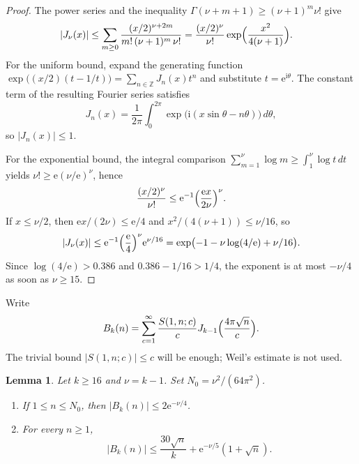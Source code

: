 \documentclass[11pt]{amsart}
\newtheorem{lemma}[theorem]{Lemma}
\theoremstyle{definition}
\theoremstyle{remark}
\numberwithin{equation}{section}
\newcommand{\ZZ}{\mathbb{Z}}
\newcommand{\ee}{\mathrm{e}}
\newcommand{\ii}{\mathrm{i}}
\begin{document}
\begin{proof}
The power series and the inequality $\Gamma(\nu+m+1)\ge(\nu+1)^m\nu!$ give
\begin{align*}
\lvert J_\nu(x)\rvert
&\le\sum_{m\ge 0}\frac{(x/2)^{\nu+2m}}{m!\,(\nu+1)^m\,\nu!}
=\frac{(x/2)^\nu}{\nu!}\exp\Bigl(\frac{x^2}{4(\nu+1)}\Bigr).
\end{align*}
For the uniform bound, expand the generating function $\exp\bigl((x/2)(t-1/t)\bigr)=\sum_{n\in\ZZ}J_n(x)t^n$ and substitute $t=\ee^{\ii\theta}$. The constant term of the resulting Fourier series satisfies
\[
J_n(x)=\frac{1}{2\pi}\int_0^{2\pi}\exp\bigl(\ii(x\sin\theta-n\theta)\bigr)\,d\theta,
\]
so $\lvert J_n(x)\rvert\le 1$.

For the exponential bound, the integral comparison $\sum_{m=1}^\nu\log m\ge\int_1^\nu\log t\,dt$ yields $\nu!\ge\ee(\nu/\ee)^\nu$, hence
\[
\frac{(x/2)^\nu}{\nu!}
\le\ee^{-1}\Bigl(\frac{\ee x}{2\nu}\Bigr)^\nu.
\]
If $x\le\nu/2$, then $\ee x/(2\nu)\le\ee/4$ and $x^2/(4(\nu+1))\le\nu/16$, so
\[
\lvert J_\nu(x)\rvert
\le\ee^{-1}\Bigl(\frac{\ee}{4}\Bigr)^\nu\ee^{\nu/16}
=\exp\bigl(-1-\nu\log(4/\ee)+\nu/16\bigr).
\]
Since $\log(4/\ee)>0.386$ and $0.386-1/16>1/4$, the exponent is at most $-\nu/4$ as soon as $\nu\ge 15$.
\end{proof}

Write
\begin{equation}\label{eq:Bk-def}
B_k(n)
=\sum_{c=1}^\infty\frac{S(1,n;c)}{c}
J_{k-1}\Bigl(\frac{4\pi\sqrt n}{c}\Bigr).
\end{equation}
The trivial bound $\lvert S(1,n;c)\rvert\le c$ will be enough; Weil's estimate is not used.

\begin{lemma}\label{lem:Bk-small}
Let $k\ge 16$ and $\nu=k-1$. Set $N_0=\nu^2/(64\pi^2)$.
\begin{enumerate}[label=\rm(\roman*)]
\item If $1\le n\le N_0$, then $\lvert B_k(n)\rvert\le 2\ee^{-\nu/4}$.
\item For every $n\ge 1$,
\[
\lvert B_k(n)\rvert
\le\frac{30\sqrt n}{k}+\ee^{-\nu/5}(1+\sqrt n).
\]
\end{enumerate}
\end{lemma}
\end{document}
